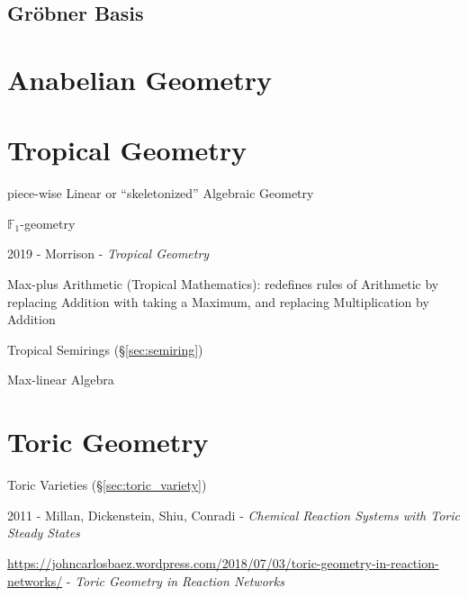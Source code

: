 \subsection{Gr\"obner Basis}\label{sec:grobner_basis}\hfill




\section{Anabelian Geometry}\label{sec:anabelian_geometry}

\section{Tropical Geometry}\label{sec:tropical_geometry}

piece-wise Linear or ``skeletonized'' Algebraic Geometry

\fist $\mathbb{F}_1$-geometry

2019 - Morrison - \emph{Tropical Geometry}

Max-plus Arithmetic (Tropical Mathematics): redefines rules of Arithmetic by
replacing Addition with taking a Maximum, and replacing Multiplication by
Addition

Tropical Semirings (\S\ref{sec:semiring})

Max-linear Algebra



\section{Toric Geometry}\label{sec:toric_geometry}

Toric Varieties (\S\ref{sec:toric_variety})

2011 - Millan, Dickenstein, Shiu, Conradi - \emph{Chemical Reaction Systems with
  Toric Steady States}

\url{https://johncarlosbaez.wordpress.com/2018/07/03/toric-geometry-in-reaction-networks/}
- \emph{Toric Geometry in Reaction Networks}
